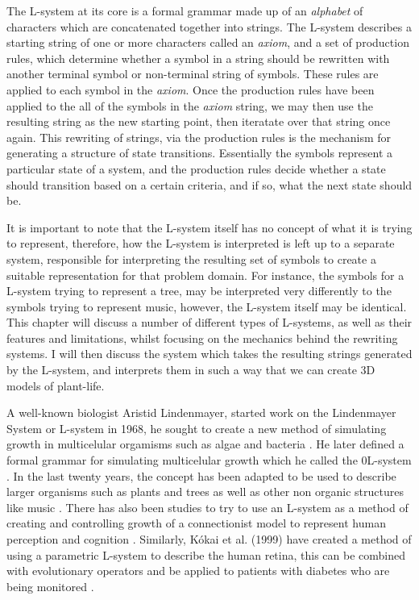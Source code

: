 
\lettrine[lines=3]{T}{}he L-system at its core is a formal grammar made up of an \textit{alphabet} of characters which are concatenated together into strings. The L-system describes a starting string of one or more characters called an \textit{axiom}, and a set of production rules, which determine whether a symbol in a string should be rewritten with another terminal symbol or non-terminal string of symbols. These rules are applied to each symbol in the \textit{axiom}. Once the production rules have been applied to the all of the symbols in the \textit{axiom} string, we may then use the resulting string as the new starting point, then iteratate over that string once again. This rewriting of strings, via the production rules is the mechanism for generating a structure of state transitions. Essentially the symbols represent a particular state of a system, and the production rules decide whether a state should transition based on a certain criteria, and if so, what the next state should be. 

It is important to note that the L-system itself has no concept of what it is trying to represent, therefore, how the L-system is interpreted is left up to a separate system, responsible for interpreting the resulting set of symbols to create a suitable representation for that problem domain. For instance, the symbols for a L-system trying to represent a tree, may be interpreted very differently to the symbols trying to represent music, however, the L-system itself may be identical. This chapter will discuss a number of different types of L-systems, as well as their features and limitations, whilst focusing on the mechanics behind the rewriting systems. I will then discuss the system which takes the resulting strings generated by the L-system, and interprets them in such a way that we can create 3D models of plant-life. 

A well-known biologist Aristid Lindenmayer, started work on the Lindenmayer System or L-system in 1968, he sought to create a new method of simulating growth in multicelular orgamisms such as algae and bacteria \cite{lindenmayer1968mathematical}. He later defined a formal grammar for simulating multicelular growth which he called the 0L-system \cite {lindenmayer1971developmental}. In the last twenty years, the concept has been adapted to be used to describe larger organisms such as plants and trees as well as other non organic structures like music \cite{worth2005growing}. There has also been studies to try to use an L-system as a method of creating and controlling growth of a connectionist model to represent human perception and cognition \cite{vaario1991connectionist}. Similarly, K{\'o}kai et al. (1999) have created a method of using a parametric L-system to describe the human retina, this can be combined with evolutionary operators and be applied to patients with diabetes who are being monitored \cite{kokai1999parametric}.


